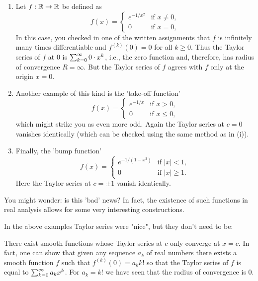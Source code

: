 \documentclass[10pt, a4paper]{article}
\newcommand{\infsumo}{\infsum[k = 0]}
\begin{document}
\begin{enumerate}[label = (\roman*)]
    \item Let $f : \mathbb{R} \rightarrow \mathbb{R}$ be defined as
    \[
    f(x) = \begin{cases}
        e ^ {-1 / x ^ 2} & \text{if }x \neq 0, \\
        0 & \text{if }x = 0,
    \end{cases}
    \]
    In this case,
    you checked in one of the written assignments that $f$ is infinitely many times differentiable and $f ^ {(k)}(0) = 0$ for all $k \geq 0$.
    Thus the Taylor series of $f$ at $0$ is $\infsumo 0 \cdot x ^ k$,
    i.e.,
    the zero function and,
    therefore,
    has radius of convergence $R = \infty$.
    But the Taylor series of $f$ agrees with $f$ only at the origin $x = 0$.

    \item Another example of this kind is the 'take-off function'
    \[
    f(x) = \begin{cases}
        e ^ {-1 / x} & \text{if }x > 0, \\
        0 & \text{if }x \leq 0,
    \end{cases}
    \]
    which might strike you as even more odd.
    Again the Taylor series at $c = 0$ vanishes identically
    (which can be checked using the same method as in (i)).

    \item Finally,
    the 'bump function'
    \[
    f(x) = \begin{cases}
        e ^ {-1 / (1 - x ^ 2)} & \text{if } |x| < 1, \\
        0 & \text{if } |x| \geq 1.
    \end{cases}
    \]
    Here the Taylor series at $c = \pm 1$ vanish identically.
\end{enumerate}

\begin{remark}
    You might wonder:
    is this 'bad' news?
    In fact,
    the existence of such functions in real analysis allows for some very interesting constructions.
\end{remark}

In the above examples Taylor series were "nice",
but they don't need to be:

\begin{example}
    There exist smooth functions whose Taylor series at $c$ only converge at $x = c$.
    In fact,
    one can show that given any sequence $a_k$ of real numbers there exists a smooth function $f$ such that $f ^ {(k)}(0) = a_kk!$ so that the Taylor series of $f$ is equal to $\infsumo a_kx ^ k$.
    For $a_k = k!$ we have seen that the radius of convergence is $0$.
\end{example}
\end{document}

